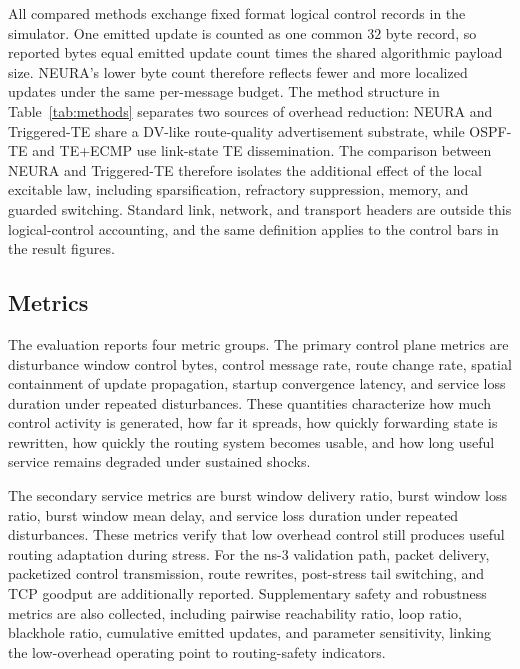 \documentclass[5p,times]{elsarticle}
\begin{document}
All compared methods exchange fixed format logical control records in the simulator. One emitted update is counted as one common $32$ byte record, so reported bytes equal emitted update count times the shared algorithmic payload size. NEURA's lower byte count therefore reflects fewer and more localized updates under the same per-message budget. The method structure in Table~\ref{tab:methods} separates two sources of overhead reduction: NEURA and Triggered-TE share a DV-like route-quality advertisement substrate, while OSPF-TE and TE+ECMP use link-state TE dissemination. The comparison between NEURA and Triggered-TE therefore isolates the additional effect of the local excitable law, including sparsification, refractory suppression, memory, and guarded switching. Standard link, network, and transport headers are outside this logical-control accounting, and the same definition applies to the control bars in the result figures.

\subsection{Metrics}

The evaluation reports four metric groups. The primary control plane metrics are disturbance window control bytes, control message rate, route change rate, spatial containment of update propagation, startup convergence latency, and service loss duration under repeated disturbances. These quantities characterize how much control activity is generated, how far it spreads, how quickly forwarding state is rewritten, how quickly the routing system becomes usable, and how long useful service remains degraded under sustained shocks.

The secondary service metrics are burst window delivery ratio, burst window loss ratio, burst window mean delay, and service loss duration under repeated disturbances. These metrics verify that low overhead control still produces useful routing adaptation during stress. For the ns-3 validation path, packet delivery, packetized control transmission, route rewrites, post-stress tail switching, and TCP goodput are additionally reported. Supplementary safety and robustness metrics are also collected, including pairwise reachability ratio, loop ratio, blackhole ratio, cumulative emitted updates, and parameter sensitivity, linking the low-overhead operating point to routing-safety indicators.
\end{document}
